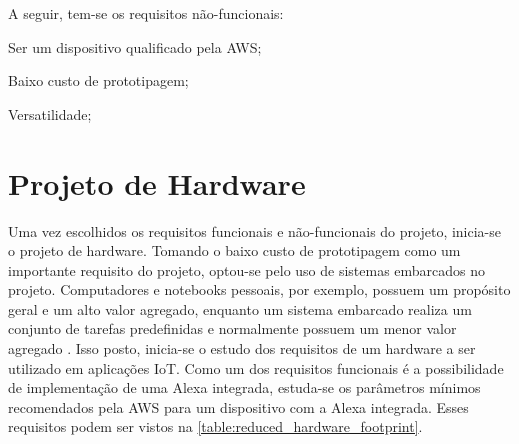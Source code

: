 A seguir, tem-se os requisitos não-funcionais:

\begin{alineas}
    \item Ser um dispositivo qualificado pela AWS;
    \item Baixo custo de prototipagem;
    \item Versatilidade;
\end{alineas}

\section{Projeto de Hardware}

Uma vez escolhidos os requisitos funcionais e não-funcionais do projeto, inicia-se o projeto de hardware. Tomando o baixo custo de prototipagem como um importante requisito do projeto, optou-se pelo uso de sistemas embarcados no projeto. Computadores e notebooks pessoais, por exemplo, possuem um propósito geral e um alto valor agregado, enquanto um sistema embarcado realiza um conjunto de tarefas predefinidas e normalmente possuem um menor valor agregado \cite{ref:033}. Isso posto, inicia-se o estudo dos requisitos de um hardware a ser utilizado em aplicações IoT. Como um dos requisitos funcionais é a possibilidade de implementação de uma Alexa integrada, estuda-se os parâmetros mínimos recomendados pela AWS para um dispositivo com a Alexa integrada. Esses requisitos podem ser vistos na \autoref{table:reduced_hardware_footprint}.

